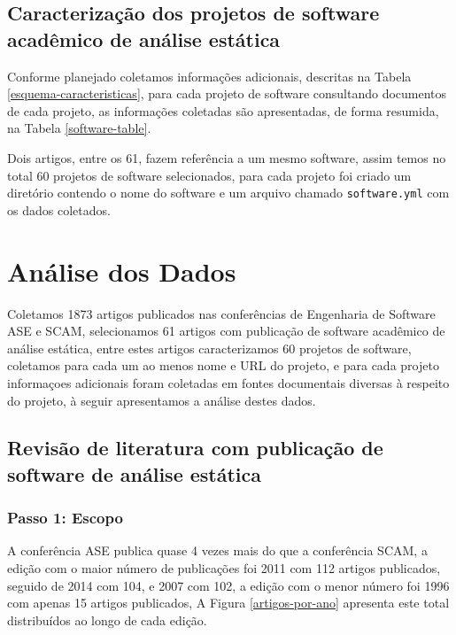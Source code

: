 \subsection{Caracterização dos projetos de software acadêmico de análise estática}

Conforme planejado coletamos informações adicionais, descritas na Tabela
\ref{esquema-caracteristicas}, para cada projeto de software consultando
documentos de cada projeto, as informações coletadas são apresentadas, de forma
resumida, na Tabela \ref{software-table}.



Dois artigos, entre os 61, fazem referência a um mesmo software, assim temos no
total 60 projetos de software selecionados, para cada projeto foi criado um
diretório contendo o nome do software e um arquivo chamado
\texttt{software.yml} com os dados coletados.


\section{Análise dos Dados} \label{estudo1:analise}

Coletamos 1873 artigos publicados nas conferências de Engenharia de Software
ASE e SCAM, selecionamos 61 artigos com publicação de software acadêmico de
análise estática, entre estes artigos caracterizamos 60 projetos de software,
coletamos para cada um ao menos nome e URL do projeto, e para cada projeto
informaçoes adicionais foram coletadas em fontes documentais diversas à respeito
do projeto, à seguir apresentamos a análise destes dados.

\subsection{Revisão de literatura com publicação de software de análise estática}

\subsubsection{Passo 1: Escopo}

A conferência ASE publica quase 4 vezes mais do que a conferência SCAM, a
edição com o maior número de publicações foi 2011 com 112 artigos publicados,
seguido de 2014 com 104, e 2007 com 102, a edição com o menor número foi 1996
com apenas 15 artigos publicados, A Figura \ref{artigos-por-ano} apresenta este
total distribuídos ao longo de cada edição.

